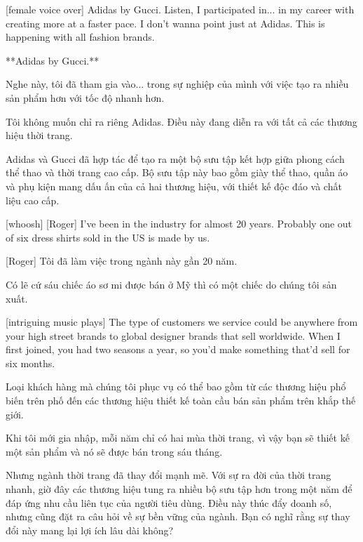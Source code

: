 \documentclass[a4paper]{article}
\begin{document}
	
	[female voice over] Adidas by Gucci.
	Listen, I participated in... in my career with creating more at a faster pace.
	I don't wanna point just at Adidas. This is happening with all fashion brands.
	
	\begin{vietnamese-v2}
		[giọng nữ] **Adidas by Gucci.**  
		
		Nghe này, tôi đã tham gia vào... trong sự nghiệp của mình với việc tạo ra nhiều sản phẩm hơn với tốc độ nhanh hơn.  
		
		Tôi không muốn chỉ ra riêng Adidas. Điều này đang diễn ra với tất cả các thương hiệu thời trang.  
		
		Adidas và Gucci đã hợp tác để tạo ra một bộ sưu tập kết hợp giữa phong cách thể thao và thời trang cao cấp. Bộ sưu tập này bao gồm giày thể thao, quần áo và phụ kiện mang dấu ấn của cả hai thương hiệu, với thiết kế độc đáo và chất liệu cao cấp.
	\end{vietnamese-v2}
	
	[whoosh]
	[Roger] I've been in the industry for almost 20 years.
	Probably one out of six dress shirts sold in the US is made by us.
	
	\begin{vietnamese-v2}
		
		[Roger] Tôi đã làm việc trong ngành này gần 20 năm.  
		
		Có lẽ cứ sáu chiếc áo sơ mi được bán ở Mỹ thì có một chiếc do chúng tôi sản xuất.  
	\end{vietnamese-v2}
	
	[intriguing music plays]
	The type of customers we service could be anywhere from your high street brands to global designer brands that sell worldwide.
	When I first joined, you had two seasons a year, so you'd make something that'd sell for six months.
	
	\begin{vietnamese-v2}
		
		Loại khách hàng mà chúng tôi phục vụ có thể bao gồm từ các thương hiệu phổ biến trên phố đến các thương hiệu thiết kế toàn cầu bán sản phẩm trên khắp thế giới.  
		
		Khi tôi mới gia nhập, mỗi năm chỉ có hai mùa thời trang, vì vậy bạn sẽ thiết kế một sản phẩm và nó sẽ được bán trong sáu tháng.  
		
		Nhưng ngành thời trang đã thay đổi mạnh mẽ. Với sự ra đời của thời trang nhanh, giờ đây các thương hiệu tung ra nhiều bộ sưu tập hơn trong một năm để đáp ứng nhu cầu liên tục của người tiêu dùng. Điều này thúc đẩy doanh số, nhưng cũng đặt ra câu hỏi về sự bền vững của ngành. Bạn có nghĩ rằng sự thay đổi này mang lại lợi ích lâu dài không?
	\end{vietnamese-v2}
	
\end{document}
